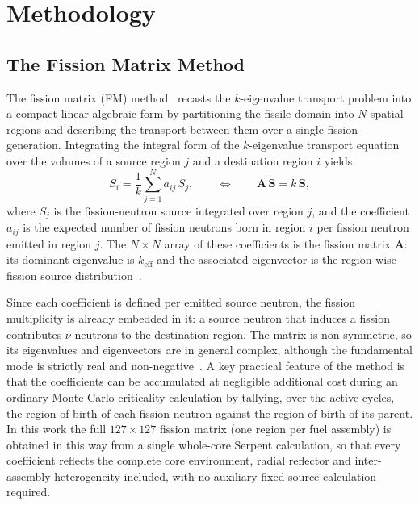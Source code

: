 \documentclass{style/nseJournal}
\begin{document}
\section{Methodology}
\label{sec:methodology}

\subsection{The Fission Matrix Method}
\label{sec:fm_method}

The fission matrix (FM) method~\cite{CarneyANE2014} recasts the $k$-eigenvalue transport problem into a compact linear-algebraic form by partitioning the fissile domain into $N$ spatial regions and describing the transport between them over a single fission generation. Integrating the integral form of the $k$-eigenvalue transport equation over the volumes of a source region $j$ and a destination region $i$ yields
\begin{equation}
  S_i = \frac{1}{k}\sum_{j=1}^{N} a_{ij}\,S_j,
  \qquad\Longleftrightarrow\qquad
  \mathbf{A}\,\mathbf{S} = k\,\mathbf{S},
  \label{eqn:fm_eigen}
\end{equation}
where $S_j$ is the fission-neutron source integrated over region $j$, and the coefficient $a_{ij}$ is the expected number of fission neutrons born in region $i$ per fission neutron emitted in region $j$. The $N\times N$ array of these coefficients is the fission matrix $\mathbf{A}$: its dominant eigenvalue is $k_{\text{eff}}$ and the associated eigenvector is the region-wise fission source distribution~\cite{CarneyANE2014}. 

Since each coefficient is defined per emitted source neutron, the fission multiplicity is already embedded in it: a source neutron that induces a fission contributes $\bar\nu$ neutrons to the destination region. The matrix is non-symmetric, so its eigenvalues and eigenvectors are in general complex, although the fundamental mode is strictly real and non-negative~\cite{CarneyANE2014}. A key practical feature of the method is that the coefficients can be accumulated at negligible additional cost during an ordinary Monte Carlo criticality calculation by tallying, over the active cycles, the region of birth of each fission neutron against the region of birth of its parent. In this work the full $127\times127$ fission matrix (one region per fuel assembly) is obtained in this way from a single whole-core Serpent calculation, so that every coefficient reflects the complete core environment, radial reflector and inter-assembly heterogeneity included, with no auxiliary fixed-source calculation required.
\end{document}

